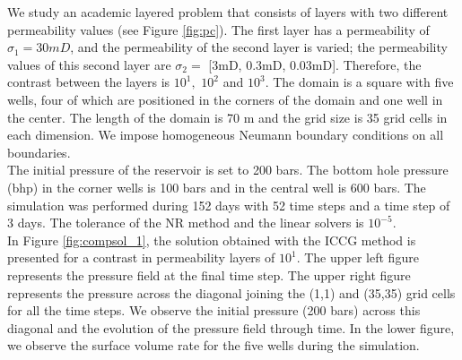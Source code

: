 \documentclass[review]{elsarticle}
\begin{document}
We study an academic layered problem that consists of layers with two different permeability values 
(see Figure \ref{fig:pc}). The first layer has a permeability of $\sigma_1 = 30mD$, and the permeability 
of the second layer is varied; the permeability values of this second layer are $\sigma_2 =$ [3mD, 0.3mD, 0.03mD]. Therefore, the contrast between the layers 
is $10^{1},$ $10^{2}$ and $10^{3}$.
The domain is a square with five wells, four of which are positioned in the corners of the domain and one 
well in the center. The length of the domain is 70 m and the grid size is 35 grid cells in each dimension.  We impose homogeneous Neumann boundary conditions on all boundaries. \\
The initial pressure of the reservoir is set to 200 bars. The bottom hole pressure (bhp) in the corner wells is 100 bars and 
in the central well is 600 bars.  
The simulation was performed during 152 days with 52 time steps and a time step of 3 days. The tolerance of 
the NR method and the linear solvers is $10^{-5}$.\\
In Figure \ref{fig:compsol_1}, the solution obtained with the ICCG method is presented for a contrast in permeability layers of $10^{1}$. The upper left figure represents the pressure field at the final time step. The upper right 
figure represents the pressure across the diagonal joining the (1,1) and (35,35) grid cells for all the time steps. 
We observe the initial pressure (200 bars) across this diagonal and the evolution of the pressure field through time. 
In the lower figure, we observe the surface volume rate for the five wells during the simulation.
\end{document}
